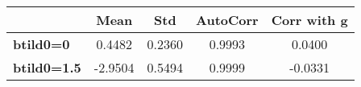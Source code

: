 \begin{tiny}\begin{tabular}{|l|c|c|c|c|}
\hline
&\textbf{Mean}&\textbf{Std}&\textbf{AutoCorr}&\textbf{Corr with g}\\\hline
\textbf{btild0=0}&0.4482&0.2360&0.9993&0.0400\\\hline
\textbf{btild0=1.5}&-2.9504&0.5494&0.9999&-0.0331\\\hline
\end{tabular}
\end{tiny}